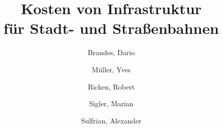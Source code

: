 \documentclass[oneside,a4paper,11pt,german]{article}
\title{Kosten von Infrastruktur \\ für Stadt- und Straßenbahnen}
\author{
  Brandes, Dario \and
  Müller, Yves \and
  Ricken, Robert \and
  Sigler, Marian \and
  Sulfrian, Alexander
}
\begin{document}
\maketitle

\begin{comment}
Gliederung:

* Einleitung


* Theorie / Grundlagen
  * Definitionen: Kein EBO, Trennung U-Bahn/Straßenbahn (Tunnel vs. nein)
  * Methode
     * wie wurden die Zahlen versucht zu ermitteln
     * welche Kennwerte wurden wie berechnet (kosten/strecken km)
     * warum sind die Kennwerte sinvoll

* Ergebnisse
  * Vorstellung der Projekte
    * Beschreibung der Strecke
    * momentaner Baustand / Plannungsstand
  * Tabelle allen Ergbnissen

* Auswertung
  * Ermittlung von Höchsts- /  Durchschnittswerten Inland getrennt U-Bahnen/Straßenbahnen
    * tabellarisch
    * mit Hilfe von Diagrammen
  * Vergleich mit den Werten im Ausland
  * Fehleranalyse (welche Außreißer existieren warum)

* Zusammenfassung


TODO:

 * Karten für alle Strecken erstellen und einfügen.
 * Tabelle mit Quellenangaben generieren.

\end{comment}













\end{document}
